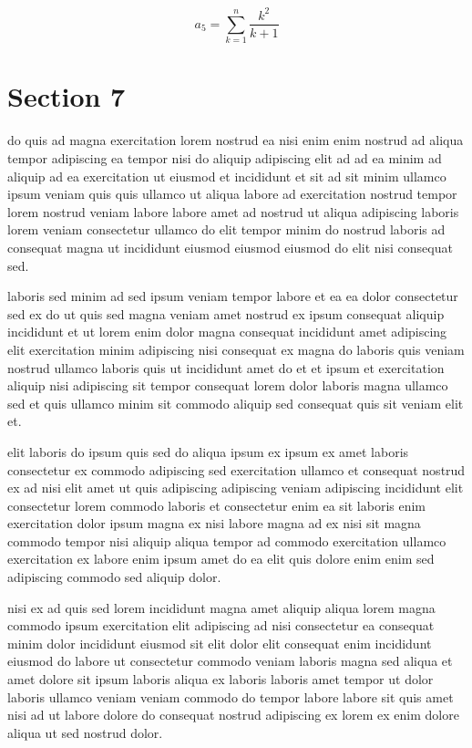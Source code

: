\documentclass{article}
\begin{document}
\begin{equation} a_{5} = \sum_{k=1}^{n} \frac{k^2}{k+1} \end{equation}
\section{Section 7}
do quis ad magna exercitation lorem nostrud ea nisi enim enim nostrud ad aliqua tempor adipiscing ea tempor nisi do aliquip adipiscing elit ad ad ea minim ad aliquip ad ea exercitation ut eiusmod et incididunt et sit ad sit minim ullamco ipsum veniam quis quis ullamco ut aliqua labore ad exercitation nostrud tempor lorem nostrud veniam labore labore amet ad nostrud ut aliqua adipiscing laboris lorem veniam consectetur ullamco do elit tempor minim do nostrud laboris ad consequat magna ut incididunt eiusmod eiusmod eiusmod do elit nisi consequat sed.

laboris sed minim ad sed ipsum veniam tempor labore et ea ea dolor consectetur sed ex do ut quis sed magna veniam amet nostrud ex ipsum consequat aliquip incididunt et ut lorem enim dolor magna consequat incididunt amet adipiscing elit exercitation minim adipiscing nisi consequat ex magna do laboris quis veniam nostrud ullamco laboris quis ut incididunt amet do et et ipsum et exercitation aliquip nisi adipiscing sit tempor consequat lorem dolor laboris magna ullamco sed et quis ullamco minim sit commodo aliquip sed consequat quis sit veniam elit et.

elit laboris do ipsum quis sed do aliqua ipsum ex ipsum ex amet laboris consectetur ex commodo adipiscing sed exercitation ullamco et consequat nostrud ex ad nisi elit amet ut quis adipiscing adipiscing veniam adipiscing incididunt elit consectetur lorem commodo laboris et consectetur enim ea sit laboris enim exercitation dolor ipsum magna ex nisi labore magna ad ex nisi sit magna commodo tempor nisi aliquip aliqua tempor ad commodo exercitation ullamco exercitation ex labore enim ipsum amet do ea elit quis dolore enim enim sed adipiscing commodo sed aliquip dolor.

nisi ex ad quis sed lorem incididunt magna amet aliquip aliqua lorem magna commodo ipsum exercitation elit adipiscing ad nisi consectetur ea consequat minim dolor incididunt eiusmod sit elit dolor elit consequat enim incididunt eiusmod do labore ut consectetur commodo veniam laboris magna sed aliqua et amet dolore sit ipsum laboris aliqua ex laboris laboris amet tempor ut dolor laboris ullamco veniam veniam commodo do tempor labore labore sit quis amet nisi ad ut labore dolore do consequat nostrud adipiscing ex lorem ex enim dolore aliqua ut sed nostrud dolor.
\end{document}
